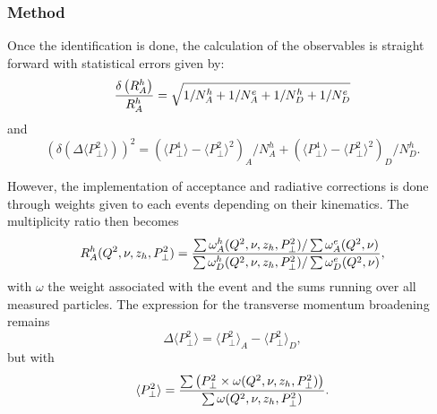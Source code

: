 \subsubsection{Method}
\label{RatioCalc}

Once the identification is done, the calculation of the observables is 
straight forward with statistical errors given by:
\begin{equation}
{\delta \left ( R_A^h \right ) \over R_A^h} = \sqrt{ 1 /N_A^h + 1/ N_A^e +1/N_D^h + 1/N_D^e}
\end{equation}
and
\begin{equation}
\left ( \delta \left ( \Delta \langle P_\perp^2 \rangle \right ) \right )^2 = 
   \left ({\langle P_\perp^4 \rangle - \langle P_\perp^2 \rangle ^2}\right )_A / N_A^h
 + \left ({\langle P_\perp^4 \rangle - \langle P_\perp^2 \rangle ^2}\right )_D / N_D^h.
\end{equation}

However, the implementation of acceptance and radiative corrections is done through weights
given to each events depending on their kinematics. The multiplicity ratio then becomes
\begin{equation}
R_A^h (Q^2,\nu,z_h,P_\perp^2) = {{\sum \omega_A^h (Q^2,\nu,z_h,P_\perp^2) / \sum \omega_A^e (Q^2,\nu)} 
                       \over {\sum \omega_D^h (Q^2,\nu,z_h,P_\perp^2) / \sum \omega_D^e (Q^2,\nu)}},
\end{equation}
with $\omega$ the weight associated with the event and the sums running over all measured 
particles. The expression for the transverse momentum broadening remains
\begin{equation}
\Delta \langle P_\perp^2 \rangle = \langle P_\perp^2 \rangle_A - \langle P_\perp^2 \rangle_D,
\end{equation}
but with
\begin{equation}
\langle P_\perp^2 \rangle = {\sum \left ( P_\perp^2 \times \omega (Q^2,\nu,z_h,P_\perp^2) \right ) \over \sum \omega (Q^2,\nu,z_h,P_\perp^2)}.
\end{equation}

